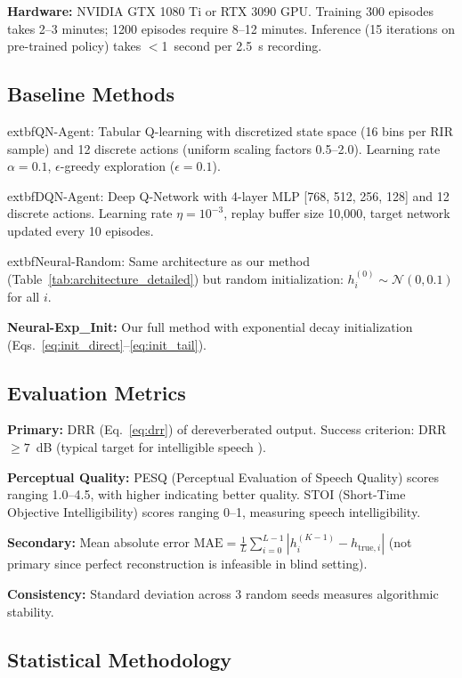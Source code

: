 \documentclass[12pt,a4paper]{article}
\begin{document}
\textbf{Hardware:} NVIDIA GTX 1080 Ti or RTX 3090 GPU. Training 300 episodes takes 2--3 minutes; 1200 episodes require 8--12 minutes. Inference (15 iterations on pre-trained policy) takes $<$1~second per 2.5~s recording.

\subsection{Baseline Methods}

            extbf{QN-Agent:} Tabular Q-learning with discretized state space (16 bins per RIR sample) and 12 discrete actions (uniform scaling factors 0.5--2.0). Learning rate $\alpha=0.1$, $\epsilon$-greedy exploration ($\epsilon=0.1$).

            extbf{DQN-Agent:} Deep Q-Network with 4-layer MLP [768, 512, 256, 128] and 12 discrete actions. Learning rate $\eta=10^{-3}$, replay buffer size 10,000, target network updated every 10 episodes.

            extbf{Neural-Random:} Same architecture as our method (Table~\ref{tab:architecture_detailed}) but random initialization: $h_i^{(0)} \sim \mathcal{N}(0, 0.1)$ for all $i$.

\textbf{Neural-Exp\_Init:} Our full method with exponential decay initialization (Eqs.~\eqref{eq:init_direct}--\eqref{eq:init_tail}).

\subsection{Evaluation Metrics}

\textbf{Primary:} DRR (Eq.~\eqref{eq:drr}) of dereverberated output. Success criterion: DRR $\geq 7$~dB (typical target for intelligible speech \cite{bradley2003review}).

\textbf{Perceptual Quality:} PESQ (Perceptual Evaluation of Speech Quality) \cite{rix2001perceptual} scores ranging 1.0--4.5, with higher indicating better quality. STOI (Short-Time Objective Intelligibility) \cite{taal2011algorithm} scores ranging 0--1, measuring speech intelligibility.

\textbf{Secondary:} Mean absolute error $\text{MAE} = \frac{1}{L}\sum_{i=0}^{L-1}|h_i^{(K-1)} - h_{\text{true},i}|$ (not primary since perfect reconstruction is infeasible in blind setting).

\textbf{Consistency:} Standard deviation across 3 random seeds measures algorithmic stability.

\subsection{Statistical Methodology}
\end{document}
